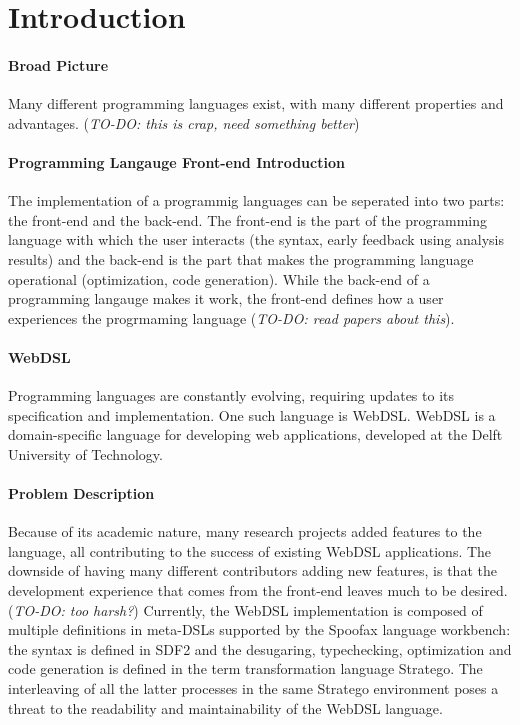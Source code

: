 
\chapter{\label{chap:introduction}Introduction}

  \subsubsection{Broad Picture}
  Many different programming languages exist, with many different properties and advantages. (\emph{TO-DO: this is crap, need something better})

  \subsubsection{Programming Langauge Front-end Introduction}
  The implementation of a programmig languages can be seperated into two parts: the front-end and the back-end. The front-end is the part of the programming language with which the user interacts (the syntax, early feedback using analysis results) and the back-end is the part that makes the programming language operational (optimization, code generation). While the back-end of a programming langauge makes it work, the front-end defines how a user experiences the progrmaming language (\emph{TO-DO: read papers about this}). 

  \subsubsection{WebDSL}
  Programming languages are constantly evolving, requiring updates to its specification and implementation. One such language is WebDSL. WebDSL is a domain-specific language for developing web applications, developed at the Delft University of Technology.

  \subsubsection{Problem Description}
  Because of its academic nature, many research projects added features to the language, all contributing to the success of existing WebDSL applications. The downside of having many different contributors adding new features, is that the development experience that comes from the front-end leaves much to be desired. (\emph{TO-DO: too harsh?}) Currently, the WebDSL implementation is composed of multiple definitions in meta-DSLs supported by the Spoofax language workbench: the syntax is defined in SDF2 and the desugaring, typechecking, optimization and code generation is defined in the term transformation language Stratego. The interleaving of all the latter processes in the same Stratego environment poses a threat to the readability and maintainability of the WebDSL language.

